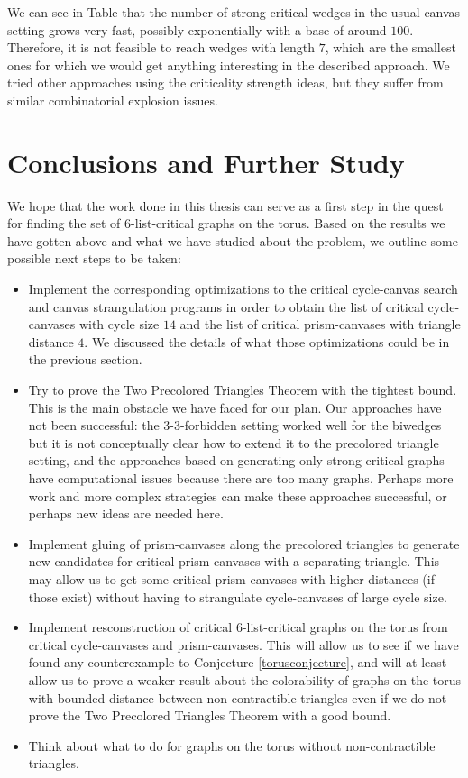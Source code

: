 We can see in Table \cite{tab:strongwedges} that the number of strong critical wedges in the usual
canvas setting grows very fast, possibly exponentially with a base of around $100$. Therefore,
it is not feasible to reach wedges with length $7$, which are the smallest ones for which we would
get anything interesting in the described approach. We tried other approaches using the
criticality strength ideas, but they suffer from similar combinatorial explosion issues. 

\section{Conclusions and Further Study}

We hope that the work done in this thesis can serve as a first step in the quest for finding the
set of 6-list-critical graphs on the torus. Based on the results we have gotten above and what 
we have studied about the problem, we outline some possible next steps to be taken:

\begin{itemize}
	\item Implement the corresponding optimizations to the critical cycle-canvas search and
	canvas strangulation programs in order to obtain the list of critical cycle-canvases with
	cycle size $14$ and the list of critical prism-canvases with triangle distance $4$. 
	We discussed the details of what those optimizations could be in the previous 
	section.
	\item Try to prove the Two Precolored Triangles Theorem with the tightest bound. 
	This is the main obstacle we have faced for our plan. 
	Our approaches have not been successful: the 3-3-forbidden
	setting worked well for the biwedges but it is not conceptually clear how to extend
	it to the precolored triangle setting, and the approaches based on generating only strong
	critical graphs have computational issues because there are too many graphs. Perhaps
	more work and more complex strategies can make these approaches successful, or
	perhaps new ideas are needed here.
	\item Implement gluing of prism-canvases along the precolored triangles to generate
	new candidates for critical prism-canvases with a separating triangle. This may allow
	us to get some critical prism-canvases with higher distances (if those exist) without
	having to strangulate cycle-canvases of large cycle size.
	\item Implement resconstruction of critical $6$-list-critical graphs on the torus
	from critical cycle-canvases and prism-canvases. This will allow us to see if we have
	found any counterexample to Conjecture \ref{torusconjecture}, and will at least allow
	us to prove a weaker result about the colorability of graphs on the torus with bounded
	distance between non-contractible triangles even if we do not prove the Two Precolored
	Triangles Theorem with a good bound. 
	\item Think about what to do for graphs on the torus without non-contractible triangles.
	
\end{itemize}






